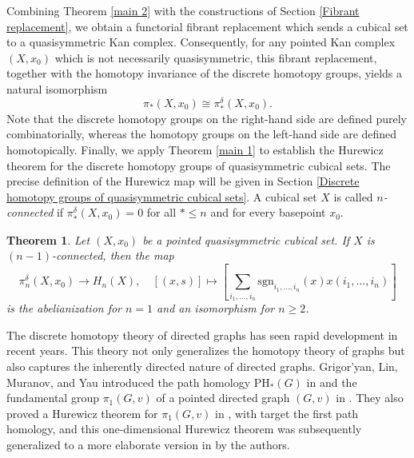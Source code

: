 \documentclass[oneside, 12pt]{amsart}
\numberwithin{equation}{section}
\theoremstyle{plain}
\newtheorem{theorem}{Theorem}[section]
\theoremstyle{definition}
\theoremstyle{remark}
\begin{document}
	Combining Theorem \ref{main 2} with the constructions of Section \ref{Fibrant replacement}, we obtain a functorial fibrant replacement which sends a cubical set to a quasisymmetric Kan complex. Consequently, for any pointed Kan complex \((X,x_0)\) which is not necessarily quasisymmetric, this fibrant replacement, together with the homotopy invariance of the discrete homotopy groups, yields a natural isomorphism
	\[
	\pi_*(X,x_0)\cong \pi_*^\delta(X,x_0).
	\]
	Note that the discrete homotopy groups on the right-hand side are defined purely combinatorially, whereas the homotopy groups on the left-hand side are defined homotopically. Finally, we apply Theorem \ref{main 1} to establish the Hurewicz theorem for the discrete homotopy groups of quasisymmetric cubical sets. The precise definition of the Hurewicz map will be given in Section \ref{Discrete homotopy groups of quasisymmetric cubical sets}. A cubical set $X$ is called \emph{$n$-connected} if $\pi_*^\delta(X,x_0)=0$ for all $*\le n$ and for every basepoint $x_0$.
	
	
	
	\begin{theorem}
		\label{main 3}
		Let $(X,x_0)$ be a pointed quasisymmetric cubical set. If $X$ is $(n-1)$-connected, then the map
		\[
		\pi_n^\delta(X,x_0)\to H_n(X),\quad[(x,s)]\mapsto\left[\sum_{i_1,\ldots,i_n}\mathrm{sgn}_{i_1,\ldots,i_n}(x)x(i_1,\ldots,i_n)\right]
		\]
		is the abelianization for $n=1$ and an isomorphism for $n\ge 2$.
	\end{theorem}

	
	The discrete homotopy theory of directed graphs has seen rapid development in recent years. This theory not only generalizes the homotopy theory of graphs but also captures the inherently directed nature of directed graphs. Grigor'yan, Lin, Muranov, and Yau \cite{GLMY2} introduced the path homology $\mathrm{PH}_*(G)$ in \cite{GLMY1} and the fundamental group $\pi_1(G,v)$ of a pointed directed graph $(G,v)$ in \cite{GLMY2}. They also proved a Hurewicz theorem for $\pi_1(G,v)$ in \cite{GLMY2}, with target the first path homology, and this one-dimensional Hurewicz theorem was subsequently generalized to a more elaborate version in \cite{KT} by the authors. 
	
	
	
\end{document}
